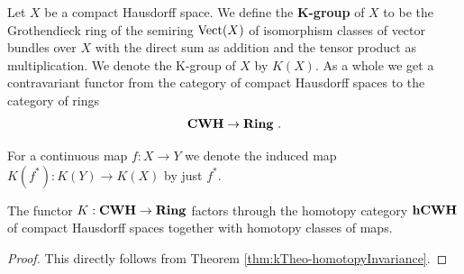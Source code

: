 \begin{definition}
	Let $X$ be a compact Hausdorff space. We define the \textbf{K-group} of $X$ to be the Grothendieck ring of the semiring $\operatorname{\mathrm{Vect}}(X)$ of isomorphism classes of vector bundles over $X$ with the direct sum as addition and the tensor product as multiplication. We denote the K-group of $X$ by $K(X)$. As a whole we get a contravariant functor from the category of compact Hausdorff spaces to the category of rings
	\begin{eqnarray}
		\operatorname{\mathbf{CWH}} \to \operatorname{\mathbf{Ring}}\,.
	\end{eqnarray}
\end{definition}
\begin{remark}
	For a continuous map $f:X\to Y$ we denote the induced map $K(f^*):K(Y)\to K(X)$ by just $f^*$.
\end{remark}
\begin{theorem}
	The functor $K:\operatorname{\mathbf{CWH}} \to \operatorname{\mathbf{Ring}}$ factors through the homotopy category $\operatorname{\mathbf{hCWH}}$ of compact Hausdorff spaces together with homotopy classes of maps. 
\end{theorem}
\begin{proof} This directly follows from Theorem \ref{thm:kTheo-homotopyInvariance}.
\end{proof}

